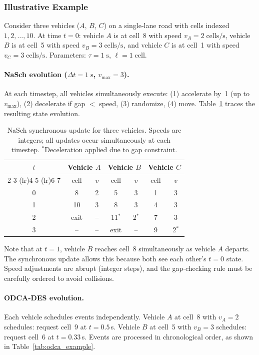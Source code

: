 \documentclass[review,number]{elsarticle}
\begin{document}
\subsubsection{Illustrative Example}

Consider three vehicles ($A$, $B$, $C$) on a single-lane road with cells indexed $1, 2, \ldots, 10$. At time $t=0$: vehicle $A$ is at cell~8 with speed $v_A = 2\;\text{cells/s}$, vehicle $B$ is at cell~5 with speed $v_B = 3\;\text{cells/s}$, and vehicle $C$ is at cell~1 with speed $v_C = 3\;\text{cells/s}$. Parameters: $\tau = 1\;\text{s}$, $\ell = 1\;\text{cell}$.

\paragraph{NaSch evolution ($\Delta t = 1\;\text{s}$, $v_{\max} = 3$).}
At each timestep, all vehicles simultaneously execute: (1) accelerate by~1 (up to $v_{\max}$), (2) decelerate if gap $<$ speed, (3) randomize, (4) move. Table~\ref{tab:nasch_example} traces the resulting state evolution.

\begin{table}[ht]
\centering
\caption{NaSch synchronous update for three vehicles. Speeds are integers; all updates occur simultaneously at each timestep. $^*$Deceleration applied due to gap constraint.}
\label{tab:nasch_example}
\begin{tabular}{@{}ccccccc@{}}
\toprule
$t$ & \multicolumn{2}{c}{Vehicle $A$} & \multicolumn{2}{c}{Vehicle $B$} & \multicolumn{2}{c}{Vehicle $C$} \\
\cmidrule(lr){2-3} \cmidrule(lr){4-5} \cmidrule(lr){6-7}
 & cell & $v$ & cell & $v$ & cell & $v$ \\
\midrule
0 & 8 & 2 & 5 & 3 & 1 & 3 \\
1 & 10 & 3 & 8 & 3 & 4 & 3 \\
2 & exit & -- & 11$^*$ & 2$^*$ & 7 & 3 \\
3 & -- & -- & exit & -- & 9 & 2$^*$ \\
\bottomrule
\end{tabular}
\end{table}

Note that at $t=1$, vehicle $B$ reaches cell~8 simultaneously as vehicle $A$ departs. The synchronous update allows this because both see each other's $t=0$ state. Speed adjustments are abrupt (integer steps), and the gap-checking rule must be carefully ordered to avoid collisions.

\paragraph{ODCA-DES evolution.}
Each vehicle schedules events independently. Vehicle $A$ at cell~8 with $v_A = 2$ schedules: request cell~9 at $t = 0.5$\,s. Vehicle $B$ at cell~5 with $v_B = 3$ schedules: request cell~6 at $t = 0.33$\,s. Events are processed in chronological order, as shown in Table~\ref{tab:odca_example}.
\end{document}
